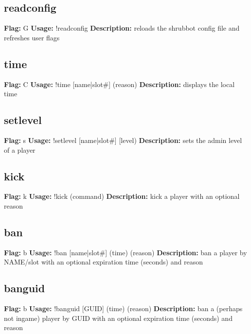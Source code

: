 \subsection{readconfig}
\textbf{Flag:} \hfill G \linebreak
\textbf{Usage:} \hfill !readconfig  \linebreak
\textbf{Description:} \hfill reloads the shrubbot config file and refreshes user flags

\subsection{time}
\textbf{Flag:} \hfill C \linebreak\textbf{Usage:} \hfill !time [name|slot\#] (reason) \linebreak
\textbf{Description:} \hfill displays the local time


\subsection{setlevel}
\textbf{Flag:} \hfill s \linebreak\textbf{Usage:} \hfill !setlevel [name|slot\#] [level) \linebreak
\textbf{Description:} \hfill sets the admin level of a player
 
\subsection{kick}
\textbf{Flag:} \hfill k \linebreak\textbf{Usage:} \hfill !kick (command) \linebreak
\textbf{Description:} \hfill kick a player with an optional reason

\subsection{ban}
\textbf{Flag:} \hfill b \linebreak\textbf{Usage:} \hfill !ban [name|slot\#] (time) (reason) \linebreak
\textbf{Description:} \hfill ban a player by NAME/slot with an optional expiration time (seconds) and reason

\subsection{banguid}
\textbf{Flag:} \hfill b \linebreak\textbf{Usage:} \hfill !banguid [GUID] (time) (reason) \linebreak
\textbf{Description:} \hfill ban a (perhaps not ingame) player by GUID with an optional expiration time (seconds) and reason

